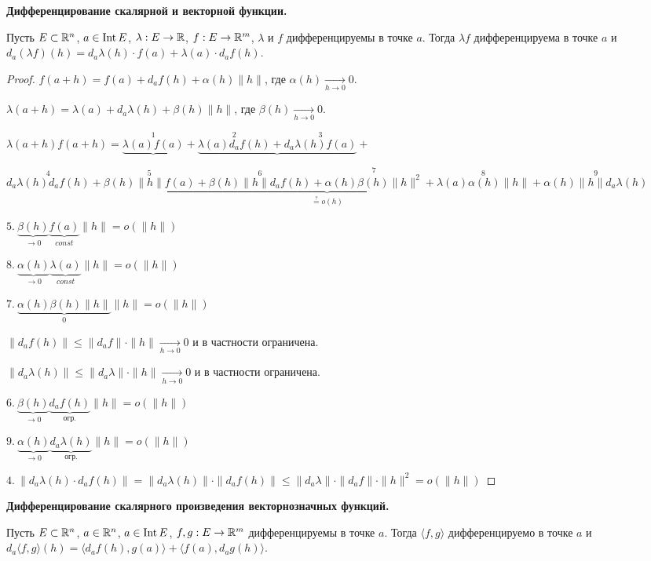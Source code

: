 \begin{theorem}
    \textbf{Дифференцирование скалярной и векторной функции.}

    Пусть $E\subset \mathbb{R}^n$, $a\in \operatorname{Int} E$, $\lambda: E\rightarrow \mathbb{R}$, $f: E\rightarrow \mathbb{R}^m$, $\lambda$ и $f$  дифференцируемы в точке $a$. Тогда $\lambda f$  дифференцируема в точке $a$ и $d_a(\lambda f)(h)=d_a\lambda (h)\cdot f(a) + \lambda (a) \cdot d_a f(h)$.
\end{theorem}

\begin{proof}
    $f(a+h) = f(a) + d_af(h) + \alpha (h)\|h\|$, где $\alpha(h)\underset{h \rightarrow 0}{\rightarrow} 0$.

    $\lambda(a+h) = \lambda(a) + d_a\lambda(h) + \beta (h)\|h\|$, где $\beta(h)\underset{h \rightarrow 0}{\rightarrow} 0$.
    
    $\lambda(a+h)f(a+h)=\underbrace{\overset{1}{\lambda(a)f(a)}}+
    \underbrace{\overset{2}{\lambda(a)d_af(h)}+
    \overset{3}{d_a\lambda(h)f(a)}}+$
    
    $\underbrace{\overset{4}{d_a\lambda(h)d_af(h)}+
    \overset{5}{\beta(h)\|h\|f(a)}+
    \overset{6}{\beta(h)\|h\|d_af(h)}+
    \overset{7}{\alpha(h)\beta(h)\|h\|^2}+
    \overset{8}{\lambda(a)\alpha(h)\|h\|}+
    \overset{9}{\alpha(h)\|h\|d_a\lambda(h)}}_{\overset{?}{=}o(h)}$

    $5.\ \underbrace{\beta(h)}_{\rightarrow 0}\underbrace{f(a)}_{const}\|h\|=o(\|h\|)$ 

    $8.\ \underbrace{\alpha(h)}_{\rightarrow 0}\underbrace{\lambda(a)}_{const}\|h\|=o(\|h\|)$ 

    $7.\ \underbrace{\alpha(h)\beta(h)\|h\|}_{0}\|h\|=o(\|h\|)$

    $\|d_af(h)\|\leq\|d_af\|\cdot \|h\|\underset{h\rightarrow 0}{\rightarrow}0$  и в частности ограничена.

    $\|d_a\lambda(h)\|\leq\|d_a\lambda\|\cdot \|h\|\underset{h\rightarrow 0}{\rightarrow}0$ и в частности ограничена.

    $6.\ \underbrace{\beta(h)}_{\rightarrow 0}\underbrace{d_af(h)}_{\text{огр.}}\|h\|=o(\|h\|)$

    $9.\ \underbrace{\alpha(h)}_{\rightarrow 0}\underbrace{d_a\lambda(h)}_{\text{огр.}}\|h\|=o(\|h\|)$

    $4.\ \|d_a\lambda(h)\cdot d_af(h)\|=\|d_a\lambda(h)\|\cdot\| d_af(h)\|\leq \|d_a\lambda\|\cdot\| d_af\| \cdot \|h\|^2=o(\|h\|)$
\end{proof}

\begin{theorem}
    \textbf{Дифференцирование скалярного произведения векторнозначных функций.}

    Пусть $E\subset \mathbb{R}^n$, $a\in \mathbb{R}^n$, $a\in \operatorname{Int} E$, $f, g:E\rightarrow \mathbb{R}^m$ дифференцируемы в точке $a$. Тогда $\langle f, g\rangle$  дифференцируемо в точке $a$ и $d_a\langle f, g\rangle (h)= \langle d_a f(h), g(a) \rangle + \langle f(a), d_a g(h)\rangle$. 
\end{theorem} 

